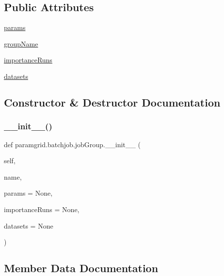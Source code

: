 \subsection*{Public Attributes}
\begin{DoxyCompactItemize}
\item 
\mbox{\hyperlink{classparamgrid_1_1batchjob_1_1jobGroup_ae9402ea80a2ddf6ba1d83ee9d71d780a}{params}}
\item 
\mbox{\hyperlink{classparamgrid_1_1batchjob_1_1jobGroup_a539dba32731939dccb249581b2c476ac}{group\+Name}}
\item 
\mbox{\hyperlink{classparamgrid_1_1batchjob_1_1jobGroup_ab9fd9a0a9ce457ff6b025a63b578af83}{importance\+Runs}}
\item 
\mbox{\hyperlink{classparamgrid_1_1batchjob_1_1jobGroup_a065f884cd181e4252469922ebe03e68b}{datasets}}
\end{DoxyCompactItemize}


\subsection{Constructor \& Destructor Documentation}
\mbox{\label{classparamgrid_1_1batchjob_1_1jobGroup_ad156ae536eceab15dd24500ab3f3732b}} 
\subsubsection{\texorpdfstring{\+\_\+\+\_\+init\+\_\+\+\_\+()}{\_\_init\_\_()}}
{\footnotesize\ttfamily def paramgrid.\+batchjob.\+job\+Group.\+\_\+\+\_\+init\+\_\+\+\_\+ (\begin{DoxyParamCaption}\item[{}]{self,  }\item[{}]{name,  }\item[{}]{params = {\ttfamily None},  }\item[{}]{importance\+Runs = {\ttfamily None},  }\item[{}]{datasets = {\ttfamily None} }\end{DoxyParamCaption})}



\subsection{Member Data Documentation}
\mbox{\label{classparamgrid_1_1batchjob_1_1jobGroup_a065f884cd181e4252469922ebe03e68b}} 
